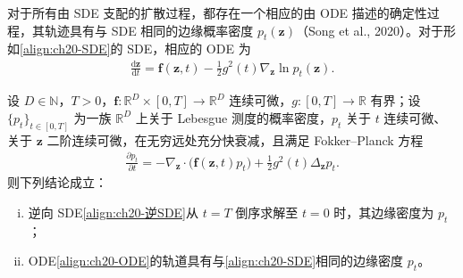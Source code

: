 \documentclass[../../main.tex]{subfiles}
\begin{document}
对于所有由 SDE 支配的扩散过程，都存在一个相应的由 ODE 描述的确定性过程，其轨迹具有与 SDE 相同的边缘概率密度 $p_t(\bm{z})$（Song et al., 2020）。对于形如\eqref{align:ch20-SDE}的 SDE，相应的 ODE 为
\begin{align}
\frac{\mathrm{d}\bm{z}}{\mathrm{d}t}=\bm{f}(\bm{z},t)-\frac{1}{2}g^2(t)\nabla_{\bm{z}}\ln p_t(\bm{z}).
\label{align:ch20-ODE}
\end{align}

\begin{proposition}\label{proposition:ch20-逆时SDE}
设 $D\in\mathbb{N}$，$T>0$，$\bm{f}:\mathbb{R}^{D}\times[0,T]\to\mathbb{R}^{D}$ 连续可微，$g:[0,T]\to\mathbb{R}$ 有界；设 $\{p_t\}_{t\in[0,T]}$ 为一族 $\mathbb{R}^{D}$ 上关于 Lebesgue 测度的概率密度，$p_t$ 关于 $t$ 连续可微、关于 $\bm{z}$ 二阶连续可微，在无穷远处充分快衰减，且满足 Fokker--Planck 方程
\begin{align*}
\frac{\partial p_t}{\partial t}=-\nabla_{\bm{z}}\cdot\big(\bm{f}(\bm{z},t)p_t\big)+\frac{1}{2}g^2(t)\Delta_{\bm{z}}p_t.
\end{align*}
则下列结论成立：
\begin{enumerate}[(i)]
\item 逆向 SDE\eqref{align:ch20-逆SDE}从 $t=T$ 倒序求解至 $t=0$ 时，其边缘密度为 $p_t$；
\item ODE\eqref{align:ch20-ODE}的轨道具有与\eqref{align:ch20-SDE}相同的边缘密度 $p_t$。
\end{enumerate}
\end{proposition}
\end{document}
